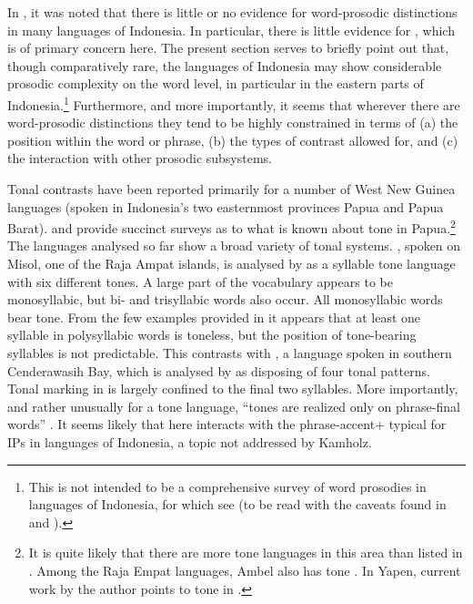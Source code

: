 \documentclass[output=paper
,modfonts
,nonflat]{langsci/langscibook}
\begin{document}
In , it was noted that there is little or no evidence for word-prosodic distinctions in many  languages of Indonesia. In particular, there is little evidence for , which is of primary concern here. The present section serves to briefly point out that, though comparatively rare, the  languages of Indonesia may show considerable prosodic complexity on the word level, in particular in the eastern parts of Indonesia.\footnote{This is not intended to be a comprehensive survey of word prosodies in  languages of Indonesia, for which see \citet{van2010} (to be read with the caveats found in \citealt{van2007b} and \citealt{Goedemans2014}).} Furthermore, and more importantly, it seems that wherever there are word-prosodic distinctions they tend to be highly constrained in terms of (a) the position within the word or phrase, (b) the types of contrast allowed for, and (c) the interaction with other prosodic subsystems.

Tonal contrasts have been reported primarily for a number of  West New Guinea languages (spoken in Indonesia’s two easternmost provinces Papua and Papua Barat). \citet{Remijsen2001} and \citet[Chapter 5]{Kamholz2014} provide succinct surveys as to what is known about tone in  Papua.\footnote{It is quite likely that there are more tone languages in this area than listed in \citet{Kamholz2014}. Among the Raja Empat languages, Ambel also has tone \citep{Arnold2017}. In Yapen, current work by the author points to tone in .} The languages analysed so far show a broad variety of tonal systems. , spoken on Misol, one of the Raja Ampat islands, is analysed by \citet{Remijsen2007} as a syllable tone language with six different tones. A large part of the  vocabulary appears to be monosyllabic, but bi- and trisyllabic words also occur. All monosyllabic words bear tone. From the few examples provided in \citet{Remijsen2007} it appears that at least one syllable in polysyllabic words is toneless, but the position of tone-bearing syllables is not predictable. This contrasts with , a language spoken in southern Cenderawasih Bay, which is analysed by \citet[101--106]{Kamholz2014} as disposing of four tonal patterns. Tonal marking in  is largely confined to the final two syllables. More importantly, and rather unusually for a tone language, “tones are realized only on phrase-final words” \citep[102]{Kamholz2014}. It seems likely that  here interacts with the phrase-accent+ typical for IPs in  languages of Indonesia, a topic not addressed by Kamholz.
\end{document}

